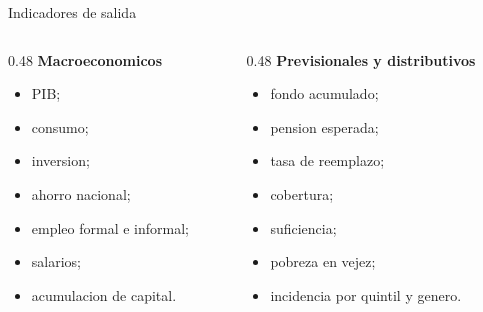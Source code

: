 \documentclass[10pt,aspectratio=169]{beamer}
\begin{document}
\begin{frame}{Indicadores de salida}
\begin{columns}[T]
\begin{column}{0.48\textwidth}
\textbf{Macroeconomicos}
\begin{itemize}
  \item PIB;
  \item consumo;
  \item inversion;
  \item ahorro nacional;
  \item empleo formal e informal;
  \item salarios;
  \item acumulacion de capital.
\end{itemize}
\end{column}
\begin{column}{0.48\textwidth}
\textbf{Previsionales y distributivos}
\begin{itemize}
  \item fondo acumulado;
  \item pension esperada;
  \item tasa de reemplazo;
  \item cobertura;
  \item suficiencia;
  \item pobreza en vejez;
  \item incidencia por quintil y genero.
\end{itemize}
\end{column}
\end{columns}
\end{frame}
\end{document}
